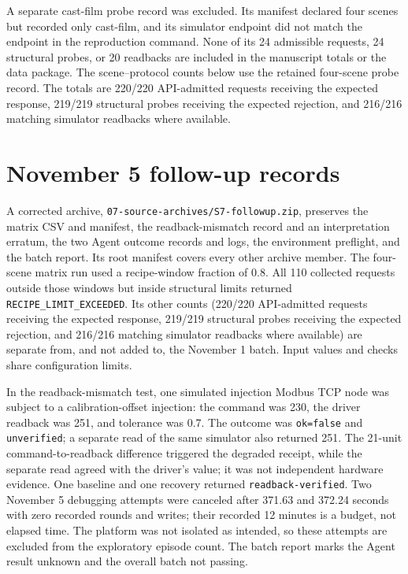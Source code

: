 \documentclass[10pt]{article}
\begin{document}
A separate cast-film probe record was excluded. Its manifest declared four scenes but recorded only cast-film, and its simulator endpoint did not match the endpoint in the reproduction command. None of its 24 admissible requests, 24 structural probes, or 20 readbacks are included in the manuscript totals or the data package. The scene--protocol counts below use the retained four-scene probe record. The totals are 220/220 API-admitted requests receiving the expected response, 219/219 structural probes receiving the expected rejection, and 216/216 matching simulator readbacks where available.

\section*{November 5 follow-up records}
A corrected archive, \texttt{07-source-archives/S7-followup.zip}, preserves the matrix CSV and manifest, the readback-mismatch record and an interpretation erratum, the two Agent outcome records and logs, the environment preflight, and the batch report. Its root manifest covers every other archive member. The four-scene matrix run used a recipe-window fraction of 0.8. All 110 collected requests outside those windows but inside structural limits returned \texttt{RECIPE\_LIMIT\_EXCEEDED}. Its other counts (220/220 API-admitted requests receiving the expected response, 219/219 structural probes receiving the expected rejection, and 216/216 matching simulator readbacks where available) are separate from, and not added to, the November 1 batch. Input values and checks share configuration limits.

In the readback-mismatch test, one simulated injection Modbus TCP node was subject to a calibration-offset injection: the command was 230, the driver readback was 251, and tolerance was 0.7. The outcome was \texttt{ok=false} and \texttt{unverified}; a separate read of the same simulator also returned 251. The 21-unit command-to-readback difference triggered the degraded receipt, while the separate read agreed with the driver's value; it was not independent hardware evidence. One baseline and one recovery returned \texttt{readback-verified}. Two November 5 debugging attempts were canceled after 371.63 and 372.24 seconds with zero recorded rounds and writes; their recorded 12 minutes is a budget, not elapsed time. The platform was not isolated as intended, so these attempts are excluded from the exploratory episode count. The batch report marks the Agent result unknown and the overall batch not passing.
\end{document}
